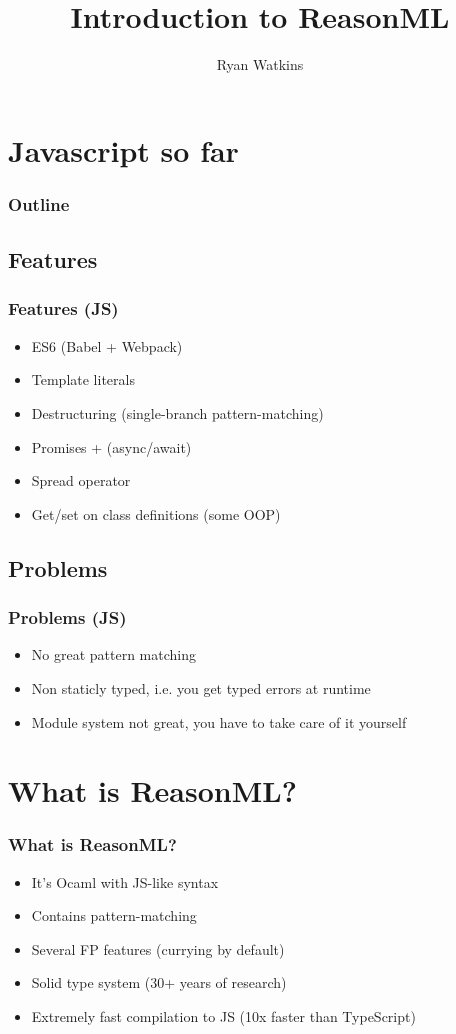 \documentclass{beamer}
\author{Ryan Watkins}
\title{Introduction to ReasonML}
\begin{document}
\begin{frame}
  \titlepage
\end{frame}


\section{Javascript so far}

\AtBeginSection[]{}
{
  \begin{frame}
    \frametitle{Outline}
    \tableofcontents[currentsection]
  \end{frame}
}

\subsection{Features}
\begin{frame}
  \frametitle{Features (JS)}
  \begin{itemize}
  \item<2-> ES6 (Babel + Webpack)
  \item<3-> Template literals
  \item<4-> Destructuring (single-branch pattern-matching)
  \item<5-> Promises + (async/await)
  \item<6-> Spread operator
  \item<7-> Get/set on class definitions (some OOP)
  \end{itemize}
\end{frame}

\subsection{Problems}
\begin{frame}
  \frametitle{Problems (JS)}
  \begin{itemize}
  \item<2-> No great pattern matching
  \item<3-> Non staticly typed, i.e. you get typed errors at runtime
  \item<4-> Module system not great, you have to take care of it yourself
  \end{itemize}
\end{frame}

\section{What is ReasonML?}
\begin{frame}
  \frametitle{What is ReasonML?}
  \pause
  \begin{itemize}
  \item<2-> It's Ocaml with JS-like syntax
  \item<3-> Contains pattern-matching
  \item<4-> Several FP features (currying by default)
  \item<5-> Solid type system (30+ years of research)
  \item<6-> Extremely fast compilation to JS (10x faster than TypeScript)
  \end{itemize}
\end{frame}
\end{document}
